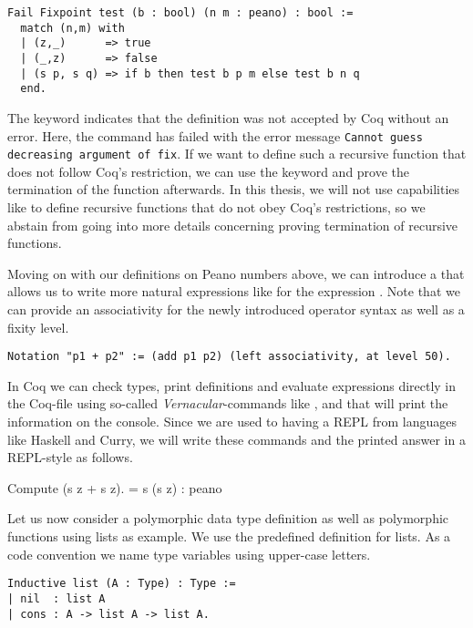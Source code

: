 \begin{verbatim}
Fail Fixpoint test (b : bool) (n m : peano) : bool :=
  match (n,m) with
  | (z,_)      => true
  | (_,z)      => false
  | (s p, s q) => if b then test b p m else test b n q
  end.
\end{verbatim}

The keyword  indicates that the definition was not accepted by Coq without an error.
Here, the command has failed with the error message \texttt{Cannot guess decreasing argument of fix}.
If we want to define such a recursive function that does not follow Coq's restriction, we can use the keyword  and prove the termination of the function afterwards.
In this thesis, we will not use capabilities like  to define recursive functions that do not obey Coq's restrictions, so we abstain from going into more details concerning proving termination of recursive functions.

Moving on with our definitions on Peano numbers above, we can introduce a  that allows us to write more natural expressions like  for
the expression .
Note that we can provide an associativity for the newly introduced operator syntax as well as a fixity level.

\begin{verbatim}
Notation "p1 + p2" := (add p1 p2) (left associativity, at level 50).
\end{verbatim}

In Coq we can check types, print definitions and evaluate expressions directly in the Coq-file using so-called \emph{Vernacular}-commands like ,  and  that will print the information on the console.
Since we are used to having a REPL from languages like Haskell and Curry, we will write these commands and the printed answer in a REPL-style as follows.

\begin{crepl}
\coqrepl Compute (s z + s z).
   = s (s z)
   : peano
\end{crepl}

Let us now consider a polymorphic data type definition as well as polymorphic functions using lists as example.
We use the predefined definition for lists.
As a code convention we name type variables using upper-case letters.

\begin{verbatim}
Inductive list (A : Type) : Type :=
| nil  : list A
| cons : A -> list A -> list A.
\end{verbatim}

